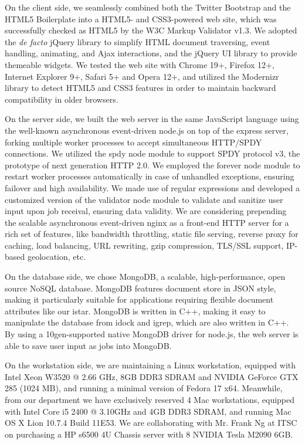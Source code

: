 On the client side, we seamlessly combined both the Twitter Bootstrap and the HTML5 Boilerplate into a HTML5- and CSS3-powered web site, which was successfully checked as HTML5 by the W3C Markup Validator v1.3. We adopted the \textit{de facto} jQuery library to simplify HTML document traversing, event handling, animating, and Ajax interactions, and the jQuery UI library to provide themeable widgets. We tested the web site with Chrome 19+, Firefox 12+, Internet Explorer 9+, Safari 5+ and Opera 12+, and utilized the Modernizr library to detect HTML5 and CSS3 features in order to maintain backward compatibility in older browsers.

On the server side, we built the web server in the same JavaScript language using the well-known asynchronous event-driven node.js on top of the express server, forking multiple worker processes to accept simultaneous HTTP/SPDY connections. We utilized the spdy node module to support SPDY protocol v3, the prototype of next generation HTTP 2.0. We employed the forever node module to restart worker processes automatically in case of unhandled exceptions, ensuring failover and high availability. We made use of regular expressions and developed a customized version of the validator node module to validate and sanitize user input upon job receival, ensuring data validity. We are considering prepending the scalable asynchronous event-driven nginx as a front-end HTTP server for a rich set of features, like bandwidth throttling, static file serving, reverse proxy for caching, load balancing, URL rewriting, gzip compression, TLS/SSL support, IP-based geolocation, etc.

On the database side, we chose MongoDB, a scalable, high-performance, open source NoSQL database. MongoDB features document store in JSON style, making it particularly suitable for applications requiring flexible document attributes like our istar. MongoDB is written in C++, making it easy to manipulate the database from idock and igrep, which are also written in C++. By using a 10gen-supported native MongoDB driver for node.js, the web server is able to save user input as jobs into MongoDB.

On the workstation side, we are maintaining a Linux workstation, equipped with Intel Xeon W3520 @ 2.66 GHz, 8GB DDR3 SDRAM and NVIDIA GeForce GTX 285 (1024 MB), and running a minimal version of Fedora 17 x64. Meanwhile, from our department we have exclusively reserved 4 Mac workstations, equipped with Intel Core i5 2400 @ 3.10GHz and 4GB DDR3 SDRAM, and running Mac OS X Lion 10.7.4 Build 11E53. We are collaborating with Mr. Frank Ng at ITSC on purchasing a HP s6500 4U Chassis server with 8 NVIDIA Tesla M2090 6GB.

